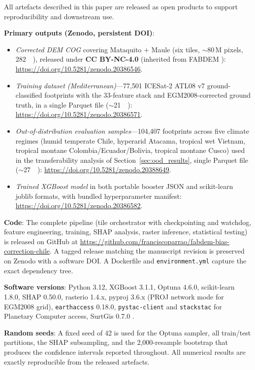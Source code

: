 \documentclass[preprint,authoryear,number]{elsarticle}
\begin{document}
All artefacts described in this paper are released as open products to support reproducibility and downstream use.

\textbf{Primary outputs (Zenodo, persistent DOI)}:
\begin{itemize}
\item \emph{Corrected DEM COG} covering Mataquito $+$ Maule (six tiles, $\sim$80\,M pixels, \SI{282}{\mega\byte}), released under \textbf{CC BY-NC-4.0} (inherited from FABDEM \citealt{Hawker2022FABDEM}): \url{https://doi.org/10.5281/zenodo.20386546}.
\item \emph{Training dataset (Mediterranean)}---77{,}501 ICESat-2 ATL08 v7 ground-classified footprints with the 33-feature stack and EGM2008-corrected ground truth, in a single Parquet file ($\sim$\SI{21}{\mega\byte}): \url{https://doi.org/10.5281/zenodo.20386571}.
\item \emph{Out-of-distribution evaluation samples}---104{,}407 footprints across five climate regimes (humid temperate Chile, hyperarid Atacama, tropical wet Vietnam, tropical montane Colombia/Ecuador/Bolivia, tropical montane Cusco) used in the transferability analysis of Section~\ref{sec:ood_results}, single Parquet file ($\sim$\SI{27}{\mega\byte}): \url{https://doi.org/10.5281/zenodo.20388649}.
\item \emph{Trained XGBoost model} in both portable booster JSON and scikit-learn joblib formats, with bundled hyperparameter manifest: \url{https://doi.org/10.5281/zenodo.20386582}.
\end{itemize}

\textbf{Code}: The complete pipeline (tile orchestrator with checkpointing and watchdog, feature engineering, training, SHAP analysis, raster inference, statistical testing) is released on GitHub at \url{https://github.com/franciscoparrao/fabdem-bias-correction-chile}. A tagged release matching the manuscript revision is preserved on Zenodo with a software DOI. A Dockerfile and \texttt{environment.yml} capture the exact dependency tree.

\textbf{Software versions}: Python 3.12, XGBoost 3.1.1, Optuna 4.6.0, scikit-learn 1.8.0, SHAP 0.50.0, rasterio 1.4.x, pyproj 3.6.x (PROJ network mode for EGM2008 grid), \texttt{earthaccess} 0.18.0, \texttt{pystac-client} and \texttt{stackstac} for Planetary Computer access, SurtGis 0.7.0 \citep{SurtGis2026}.

\textbf{Random seeds}: A fixed seed of 42 is used for the Optuna sampler, all train/test partitions, the SHAP subsampling, and the 2{,}000-resample bootstrap that produces the confidence intervals reported throughout. All numerical results are exactly reproducible from the released artefacts.
\end{document}

